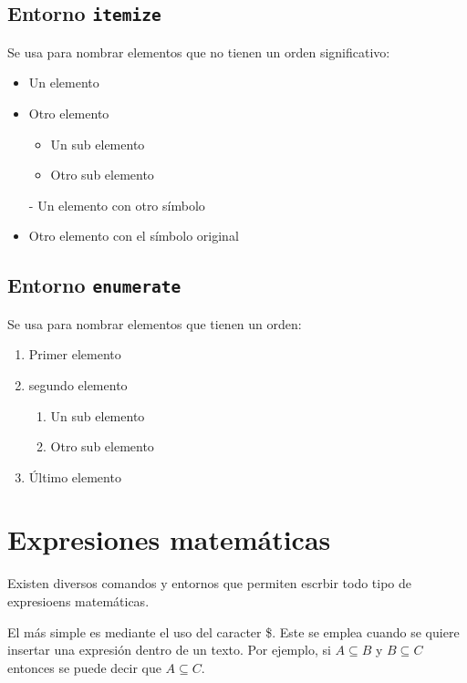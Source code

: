 \documentclass[a4paper,12pt]{article}
\begin{document}
\subsection{Entorno \texttt{itemize}}\label{sub:itemize}

Se usa para nombrar elementos que no tienen un orden significativo:

\begin{itemize}
    \item Un elemento
    \item Otro elemento
    \begin{itemize}
        \item Un sub elemento
        \item Otro sub elemento
    \end{itemize}
    \item[-] Un elemento con otro símbolo
    \item Otro elemento con el símbolo original
\end{itemize}

\subsection{Entorno \texttt{enumerate}}\label{sub:enumerate}

Se usa para nombrar elementos que tienen un orden:

\begin{enumerate}
    \item Primer elemento
    \item segundo elemento
    \begin{enumerate}
        \item Un sub elemento
        \item Otro sub elemento
    \end{enumerate}
    \item Último elemento
\end{enumerate}

\section{Expresiones matemáticas}\label{sec:math}

Existen diversos comandos y entornos que permiten escrbir todo tipo de
expresioens matemáticas.

El más simple es mediante el uso del caracter \$. Este se emplea cuando se
quiere insertar una expresión dentro de un texto. Por ejemplo, si $A \subseteq
B$ y $B \subseteq C$ entonces se puede decir que $A \subseteq C$.
\end{document}
